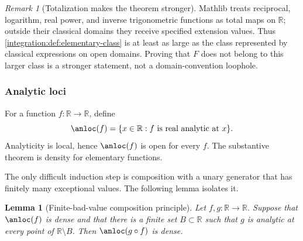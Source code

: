 \documentclass[11pt,oneside]{article}
\newtheorem{lemma}[lemma]{Lemma}
\theoremstyle{definition}
\theoremstyle{remark}
\newtheorem{remark}[remark]{Remark}
\newcommand{\R}{\mathbb R}
\begin{document}
\begin{remark}[Totalization makes the theorem stronger]
\label{integration:rem:elementary-totalization}
Mathlib treats reciprocal, logarithm, real power, and inverse trigonometric functions as
total maps on $\R$; outside their classical domains they receive specified extension values.
Thus \cref{integration:def:elementary-class} is at least as large as the class represented by classical
expressions on open domains.  Proving that $F$ does not belong to this larger class is a
stronger statement, not a domain-convention loophole.
\end{remark}

\subsubsection{Analytic loci}

For a function $f:\R\to\R$, define
\begin{equation}
 \anloc(f)=\{x\in\R:f\text{ is real analytic at }x\}.
 \label{integration:eq:analytic-locus}
\end{equation}
Analyticity is local, hence $\anloc(f)$ is open for every $f$.  The substantive theorem is
density for elementary functions.

The only difficult induction step is composition with a unary generator that has finitely
many exceptional values.  The following lemma isolates it.

\begin{lemma}[Finite-bad-value composition principle]
\label{integration:lem:finite-bad-composition}
Let $f,g:\R\to\R$.  Suppose that $\anloc(f)$ is dense and that there is a finite set
$B\subset\R$ such that $g$ is analytic at every point of $\R\setminus B$.  Then
$\anloc(g\circ f)$ is dense.
\end{lemma}
\end{document}
